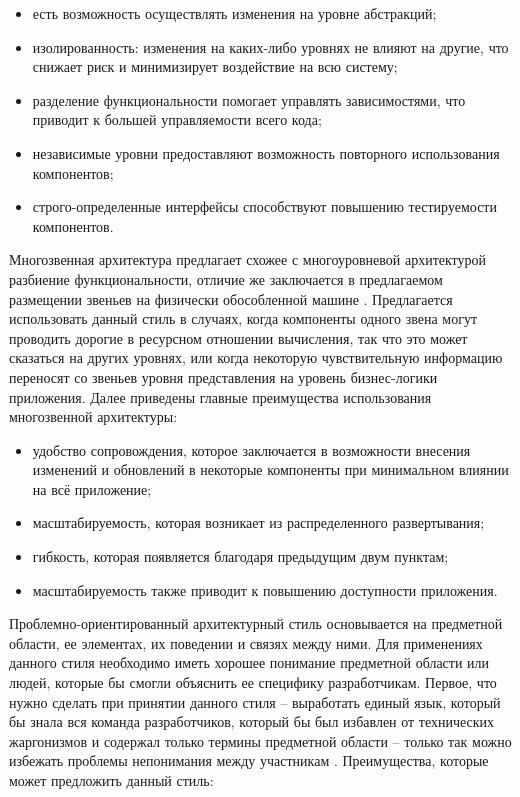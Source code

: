 \begin{itemize}
	\item есть возможность осуществлять изменения на уровне абстракций;
	\item изолированность: изменения на каких-либо уровнях не влияют на другие, что снижает риск и минимизирует воздействие на всю систему;
	\item разделение функциональности помогает управлять зависимостями, что приводит к большей управляемости всего кода;
	\item независимые уровни предоставляют возможность повторного использования компонентов;
	\item строго-определенные интерфейсы способствуют повышению тестируемости компонентов.
\end{itemize}

Многозвенная архитектура предлагает схожее с многоуровневой архитектурой разбиение функциональности, отличие же
заключается в предлагаемом размещении звеньев на физически обособленной машине \cite{architecture_volosevich}.
Предлагается использовать данный стиль в случаях, когда компоненты одного звена могут проводить дорогие в ресурсном
отношении вычисления, так что это может сказаться на других уровнях, или когда некоторую чувствительную информацию
переносят со звеньев уровня представления на уровень бизнес-логики приложения. Далее приведены главные преимущества
использования многозвенной архитектуры:

\begin{itemize}
  \item удобство сопровождения, которое заключается в возможности внесения изменений и обновлений в некоторые компоненты
  при минимальном влиянии на всё приложение;
	\item масштабируемость, которая возникает из распределенного развертывания;
	\item гибкость, которая появляется благодаря предыдущим двум пунктам;
	\item масштабируемость также приводит к повышению доступности приложения.
\end{itemize}

Проблемно-ориентированный архитектурный стиль основывается на \linebreak предметной области, ее элементах, их поведении и
связях между ними. Для применениях данного стиля необходимо иметь хорошее понимание предметной области или людей,
которые бы смогли объяснить ее специфику разработчикам. Первое, что нужно сделать при принятии данного
стиля -- выработать единый язык, который бы знала вся команда разработчиков, который бы был избавлен от технических
жаргонизмов и содержал только термины предметной области -- только так можно избежать проблемы непонимания между
участникам \cite{ddd_quickly}. Преимущества, которые может предложить данный стиль:

